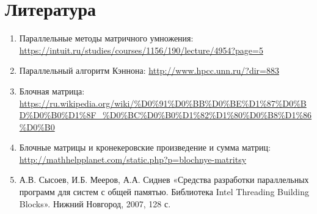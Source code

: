 \documentclass{report}
\begin{document}
\section*{Литература}
\begin{enumerate}
\item Параллельные методы матричного умножения: \newline \url{https://intuit.ru/studies/courses/1156/190/lecture/4954?page=5}
\item Параллельный алгоритм Кэннона: \newline \url{http://www.hpcc.unn.ru/?dir=883}
\item Блочная матрица: \newline 
\url{https://ru.wikipedia.org/wiki/%D0%91%D0%BB%D0%BE%D1%87%D0%BD%D0%B0%D1%8F_%D0%BC%D0%B0%D1%82%D1%80%D0%B8%D1%86%D0%B0}
\item Блочные матрицы и кронекеровские произведение и сумма матриц: \newline 
\url{http://mathhelpplanet.com/static.php?p=blochnye-matritsy}
\item А.В. Сысоев, И.Б. Мееров, А.А. Сиднев «Средства разработки параллельных программ для систем с общей памятью. Библиотека Intel Threading Building Blocks». Нижний Новгород, 2007, 128 с. 
\end{enumerate} 
\newpage

\end{document}
